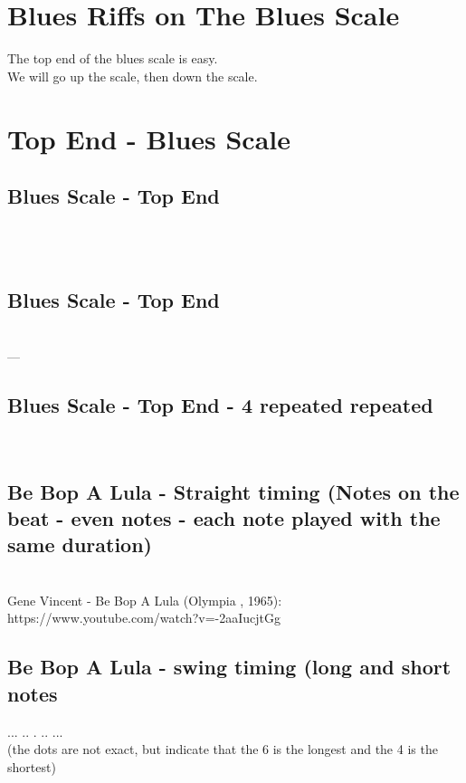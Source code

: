 \newpage
    \section{Blues Riffs on The Blues Scale}
    The top end of the blues scale is easy. 
    \\ We will go up the scale, then down the scale. \Uparrow \Downarrow
        \section*{Top End - Blues Scale}
            \subsection*{Blues Scale - Top End \Uparrow}
                \4\5\six\\ \\
                
            \subsection*{Blues Scale - Top End \Downarrow}
                \six\5\4 \\
---         \subsection*{Blues Scale - Top End - 4 repeated repeated \Downarrow}
                \six\5\4\4 \\
                \six\5\4\4

            \subsection*{Be Bop A Lula - Straight timing (Notes on the beat - even notes - each note played with the same duration)}
                \six \5 \4 \5 \six \\
                Gene Vincent - Be Bop A Lula (Olympia , 1965): \\
                https://www.youtube.com/watch?v=-2aaIucjtGg
            \subsection*{Be Bop A Lula - swing timing (long and short notes}
                \six... \5.. \4. \5.. \six... \\
                (the dots are not exact, but indicate that the 6 is the longest and the 4 is the shortest)
    
